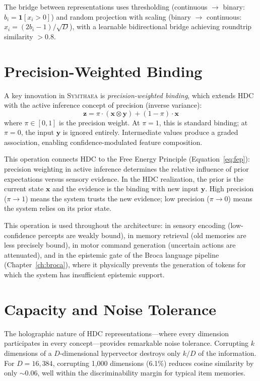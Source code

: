 \documentclass[12pt]{book}
\newcommand{\bind}{\otimes}
\newcommand{\symthaea}{\textsc{Symthaea}}
\begin{document}
The bridge between representations uses thresholding (continuous $\to$ binary: $b_i = \mathbf{1}[x_i > 0]$) and random projection with scaling (binary $\to$ continuous: $x_i = (2b_i - 1) / \sqrt{D}$), with a learnable bidirectional bridge achieving roundtrip similarity $> 0.8$.

\section{Precision-Weighted Binding}

A key innovation in \symthaea{} is \textit{precision-weighted binding}, which extends HDC with the active inference concept of precision (inverse variance):
\begin{equation}\label{eq:precision-binding}
\mathbf{z} = \pi \cdot (\mathbf{x} \bind \mathbf{y}) + (1 - \pi) \cdot \mathbf{x}
\end{equation}
where $\pi \in [0, 1]$ is the precision weight. At $\pi = 1$, this is standard binding; at $\pi = 0$, the input $\mathbf{y}$ is ignored entirely. Intermediate values produce a graded association, enabling confidence-modulated feature composition.

This operation connects HDC to the Free Energy Principle (Equation~\ref{eq:fep}): precision weighting in active inference determines the relative influence of prior expectations versus sensory evidence. In the HDC realization, the prior is the current state $\mathbf{x}$ and the evidence is the binding with new input $\mathbf{y}$. High precision ($\pi \to 1$) means the system trusts the new evidence; low precision ($\pi \to 0$) means the system relies on its prior state.

This operation is used throughout the architecture: in sensory encoding (low-confidence percepts are weakly bound), in memory retrieval (old memories are less precisely bound), in motor command generation (uncertain actions are attenuated), and in the epistemic gate of the Broca language pipeline (Chapter~\ref{ch:broca}), where it physically prevents the generation of tokens for which the system has insufficient epistemic support.

\section{Capacity and Noise Tolerance}

The holographic nature of HDC representations---where every dimension participates in every concept---provides remarkable noise tolerance. Corrupting $k$ dimensions of a $D$-dimensional hypervector destroys only $k/D$ of the information. For $D = 16{,}384$, corrupting 1,000 dimensions (6.1\%) reduces cosine similarity by only $\sim$0.06, well within the discriminability margin for typical item memories.
\end{document}
